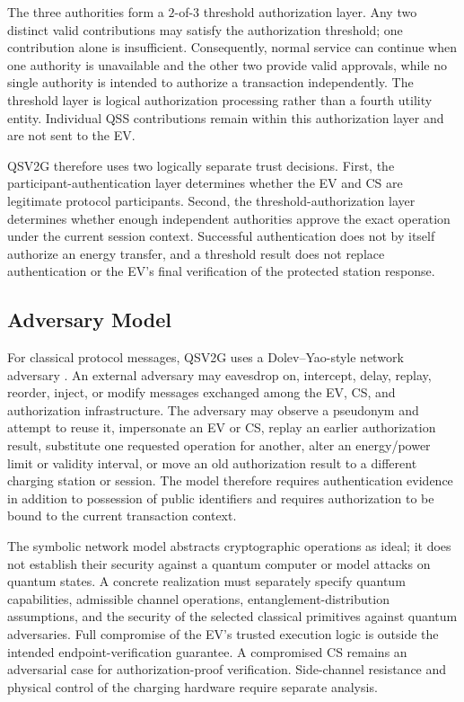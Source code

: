 \documentclass[twocolumn,10pt,journal]{IEEEtran}
\begin{document}
The three authorities form a $2$-of-$3$ threshold authorization layer. Any two distinct valid contributions may satisfy the authorization threshold; one contribution alone is insufficient. Consequently, normal service can continue when one authority is unavailable and the other two provide valid approvals, while no single authority is intended to authorize a transaction independently. The threshold layer is logical authorization processing rather than a fourth utility entity. Individual QSS contributions remain within this authorization layer and are not sent to the EV.



QSV2G therefore uses two logically separate trust decisions. First, the participant-authentication layer determines whether the EV and CS are legitimate protocol participants. Second, the threshold-authorization layer determines whether enough independent authorities approve the exact operation under the current session context. Successful authentication does not by itself authorize an energy transfer, and a threshold result does not replace authentication or the EV's final verification of the protected station response.

\subsection{Adversary Model}
For classical protocol messages, QSV2G uses a Dolev--Yao-style network adversary \cite{dolev1983security}. An external adversary may eavesdrop on, intercept, delay, replay, reorder, inject, or modify messages exchanged among the EV, CS, and authorization infrastructure. The adversary may observe a pseudonym and attempt to reuse it, impersonate an EV or CS, replay an earlier authorization result, substitute one requested operation for another, alter an energy/power limit or validity interval, or move an old authorization result to a different charging station or session. The model therefore requires authentication evidence in addition to possession of public identifiers and requires authorization to be bound to the current transaction context.

The symbolic network model abstracts cryptographic operations as ideal; it does not establish their security against a quantum computer or model attacks on quantum states. A concrete realization must separately specify quantum capabilities, admissible channel operations, entanglement-distribution assumptions, and the security of the selected classical primitives against quantum adversaries. Full compromise of the EV's trusted execution logic is outside the intended endpoint-verification guarantee. A compromised CS remains an adversarial case for authorization-proof verification. Side-channel resistance and physical control of the charging hardware require separate analysis.
\end{document}
